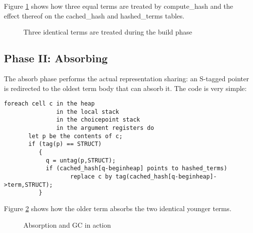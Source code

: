 \documentclass{tlp}
\begin{document}
Figure \ref{fig:pic1} shows how three equal terms are treated by
compute\_hash and the effect thereof on the cached\_hash and hashed\_terms tables.



\begin{figure}[h]
\begin{centering}
\caption{Three identical terms are treated during the build phase}
\label{fig:pic1}
\end{centering}
\end{figure}

\subsection{Phase II: Absorbing}

The absorb phase performs the actual representation sharing: an
S-tagged pointer is redirected to the oldest term body that can absorb
it. The code is very simple:

\begin{Verbatim}[fontsize=\small, frame=single,samepage=true]
foreach cell c in the heap
               in the local stack
               in the choicepoint stack
               in the argument registers do
       let p be the contents of c;
       if (tag(p) == STRUCT)
          {
            q = untag(p,STRUCT);
            if (cached_hash[q-beginheap] points to hashed_terms)
                   replace c by tag(cached_hash[q-beginheap]->term,STRUCT); 
          }
\end{Verbatim}


Figure \ref{fig:pic2} shows how the older term absorbs the two
identical younger terms.



\begin{figure}[h]
\begin{centering}
\caption{Absorption and GC in action}
\label{fig:pic2}
\end{centering}
\end{figure}
\end{document}
